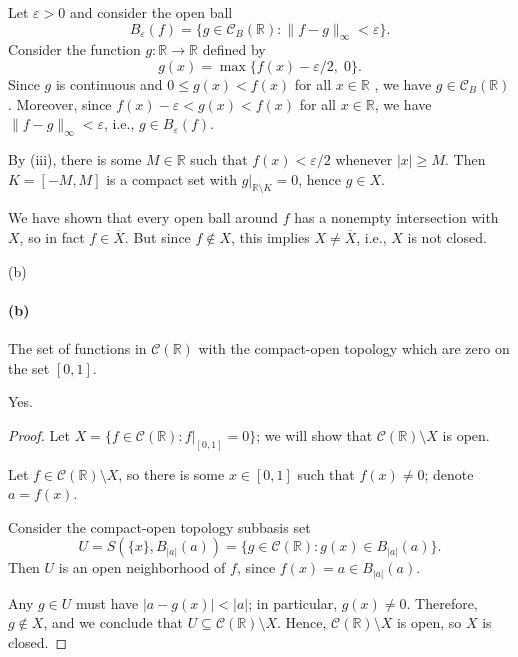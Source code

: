 \documentclass[12pt]{article}
\newlength{\myparskip}
\newenvironment{fullbox}{\begin{lrbox}{\savefullbox}\begin{minipage}{\dimexpr\textwidth-2\fboxsep\relax}\setlength{\parskip}{\myparskip}}{\end{minipage}\end{lrbox}\framebox[\textwidth]{\usebox{\savefullbox}}}
\newenvironment{pbox}[1][]{\begin{fullbox}\ifx#1\empty\else\paragraph{#1}\fi}{\end{fullbox}}
\theoremstyle{definition}
\newcommand{\R}{\mathbb{R}}
\newcommand{\eps}{\varepsilon}
\newcommand{\<}{\langle}
\renewcommand{\>}{\rangle}
\newcommand{\clo}{\overline}
\newcommand{\CC}{\mathcal{C}}
\begin{document}
Let $\eps > 0$ and consider the open ball
\[
    B_\eps(f) = \{g \in \CC_B(\R) : \|f - g\|_{\infty} < \eps\}.
\]
Consider the function $g : \R \to \R$ defined by
\[
    g(x) = \max\{f(x) - \eps/2,\; 0\}.
\]
Since $g$ is continuous and $0 \leq g(x) < f(x)$ for all $x \in \R$ , we have $g \in \CC_B(\R)$. Moreover, since $f(x) - \eps < g(x) < f(x)$ for all $x \in \R$, we have $\|f - g\|_{\infty} < \eps$, i.e., $g \in B_\eps(f)$.

By (iii), there is some $M \in \R$ such that $f(x) < \eps/2$ whenever $|x| \geq M$. Then $K = [-M, M]$ is a compact set with $g|_{\R \setminus K} = 0$, hence $g \in X$.

We have shown that every open ball around $f$ has a nonempty intersection with $X$, so in fact $f \in \clo{X}$. But since $f \notin X$, this implies $X \ne \clo{X}$, i.e., $X$ is not closed.


\newpage
\begin{pbox}[(b)]
    The set of functions in $\CC(\R)$ with the compact-open topology which are zero on the set $[0, 1]$.
\end{pbox}

Yes.

\begin{proof}
    Let $X = \{f \in \CC(\R) : f|_{[0, 1]} = 0\}$; we will show that $\CC(\R) \setminus X$ is open.

    Let $f \in \CC(\R) \setminus X$, so there is some $x \in [0, 1]$ such that $f(x) \ne 0$; denote $a = f(x)$.

    Consider the compact-open topology subbasis set
    \[
        U = S(\{x\}, B_{|a|}(a)) = \{g \in \CC(\R) : g(x) \in B_{|a|}(a)\}.
    \]
    Then $U$ is an open neighborhood of $f$, since $f(x) = a \in B_{|a|}(a)$.
    
    Any $g \in U$ must have $|a - g(x)| < |a|$; in particular, $g(x) \ne 0$. Therefore, $g \notin X$, and we conclude that $U \subseteq \CC(\R) \setminus X$. Hence, $\CC(\R) \setminus X$ is open, so $X$ is closed.

\end{proof}
\end{document}
